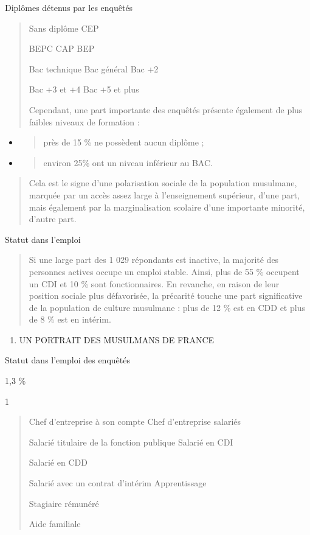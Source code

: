 Diplômes détenus par les enquêtés

\begin{quote}
Sans diplôme CEP

BEPC CAP BEP

Bac technique Bac général Bac +2

Bac +3 et +4 Bac +5 et plus

Cependant, une part importante des enquêtés présente également de plus
faibles niveaux de formation :
\end{quote}

\begin{itemize}
\item
  \begin{quote}
  près de 15 \% ne possèdent aucun diplôme ;
  \end{quote}
\item
  \begin{quote}
  environ 25\% ont un niveau inférieur au BAC.
  \end{quote}
\end{itemize}

\begin{quote}
Cela est le signe d'une polarisation sociale de la population musulmane,
marquée par un accès assez large à l'enseignement supérieur, d'une part,
mais également par la marginalisation scolaire d'une importante
minorité, d'autre part.
\end{quote}

Statut dans l'emploi

\begin{quote}
Si une large part des 1 029 répondants est inactive, la majorité des
personnes actives occupe un emploi stable. Ainsi, plus de 55 \% occupent
un CDI et 10 \% sont fonctionnaires. En revanche, en raison de leur
position sociale plus défavorisée, la précarité touche une part
significative de la population de culture musulmane : plus de 12 \% est
en CDD et plus de 8 \% est en intérim.
\end{quote}

\begin{enumerate}
\def\labelenumi{\Roman{enumi}.}
\item
  UN PORTRAIT DES MUSULMANS DE FRANCE
\end{enumerate}

Statut dans l'emploi des enquêtés

1,3 \%

1

\begin{quote}
Chef d'entreprise à son compte Chef d'entreprise salariés

Salarié titulaire de la fonction publique Salarié en CDI

Salarié en CDD

Salarié avec un contrat d'intérim Apprentissage

Stagiaire rémunéré

Aide familiale
\end{quote}

